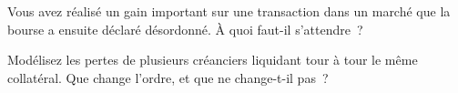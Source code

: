 \begin{interviewq}\label{iq:fm:case-studies-ii:5}
Vous avez réalisé un gain important sur une transaction dans un marché que la bourse a ensuite déclaré désordonné. À quoi faut-il s'attendre~?
\end{interviewq}

\begin{interviewq}\label{iq:fm:case-studies-ii:6}
Modélisez les pertes de plusieurs créanciers liquidant tour à tour le même collatéral. Que change l'ordre, et que ne change-t-il pas~?
\end{interviewq}
